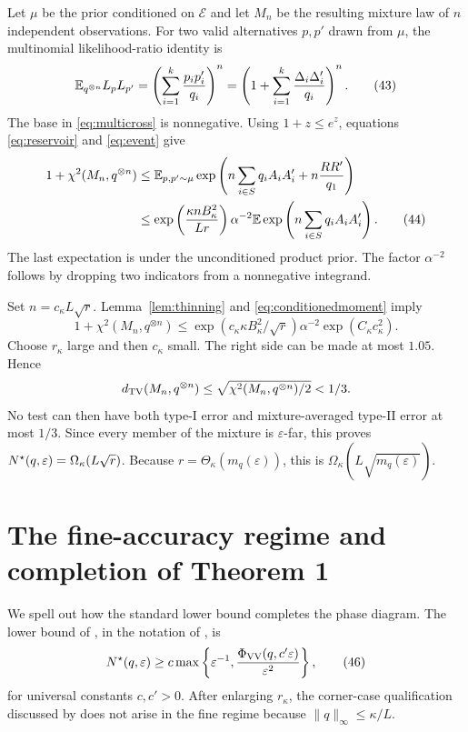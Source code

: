 Let $\mu$ be the prior conditioned on $\mathcal E$ and let $M_n$ be the
resulting mixture law of $n$ independent observations. For two valid
alternatives $p,p'$ drawn from $\mu$, the multinomial likelihood-ratio
identity is
\[
 \mathbb E_{q^{\otimes n}}L_pL_{p'}
 =\left(\sum_{i=1}^k\frac{p_ip_i'}{q_i}\right)^n
 =\left(1+\sum_{i=1}^k\frac{\Delta_i\Delta_i'}{q_i}\right)^n.
 \tag{43}\label{eq:multicross}
\]
The base in \eqref{eq:multicross} is nonnegative. Using
$1+z\leq e^z$, equations \eqref{eq:reservoir} and
\eqref{eq:event} give
\begin{align}
 1+\chi^2(M_n,q^{\otimes n})
 &\leq\mathbb E_{p,p'\sim\mu}
 \exp\left(n\sum_{i\in S}q_iA_iA_i'+n\frac{RR'}{q_1}\right)\nonumber\\
 &\leq \exp\left(\frac{\kappa nB_\kappa^2}{Lr}\right)
 \alpha^{-2}
 \mathbb E\exp\left(n\sum_{i\in S}q_iA_iA_i'\right).           \tag{44}\label{eq:conditionedmoment}
\end{align}
The last expectation is under the unconditioned product prior. The factor
$\alpha^{-2}$ follows by dropping two indicators from a nonnegative
integrand.

Set $n=c_\kappa L\sqrt r$. Lemma~\ref{lem:thinning} and
\eqref{eq:conditionedmoment} imply
\[
 1+\chi^2(M_n,q^{\otimes n})
 \leq \exp(c_\kappa\kappa B_\kappa^2/\sqrt r)
       \alpha^{-2}\exp(C_\kappa c_\kappa^2).
 \tag{45}\label{eq:finalchi}
\]
Choose $r_\kappa$ large and then $c_\kappa$ small. The right side can be made at most
$1.05$. Hence
\[
 d_{\mathrm{TV}}(M_n,q^{\otimes n})
 \leq\sqrt{\chi^2(M_n,q^{\otimes n})/2}<1/3.
\]
No test can then have both type-I error and mixture-averaged type-II error
at most $1/3$. Since every member of the mixture is
$\varepsilon$-far, this proves
$N^\star(q,\varepsilon)=\Omega_\kappa(L\sqrt r)$. Because
$r=\Theta_\kappa(m_q(\varepsilon))$, this is
$\Omega_\kappa(L\sqrt{m_q(\varepsilon)})$.

\section{The fine-accuracy regime and completion of Theorem 1}
\label{app:assembly}

We spell out how the standard lower bound completes the phase diagram. The
lower bound of \citet[Proposition 2]{valiant2017automatic}, in the notation
of \citet{canonne2024open}, is
\[
 N^\star(q,\varepsilon)
 \geq c\max\left\{\varepsilon^{-1},
 \frac{\Phi_{\mathrm{VV}}(q,c'\varepsilon)}{\varepsilon^2}
 \right\},                                                \tag{46}\label{eq:vvbound}
\]
for universal constants $c,c'>0$. After enlarging $r_\kappa$, the
corner-case qualification discussed by \citet{canonne2024open} does not
arise in the fine regime because $\|q\|_\infty\leq\kappa/L$.

